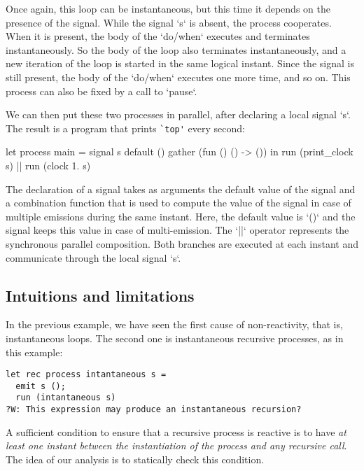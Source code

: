 \documentclass[9pt,preprint]{sigplanconf}
\begin{document}
Once again, this loop can be instantaneous, but this time it depends on the presence of the signal. While the signal `s` is absent, the process cooperates. When it is present, the body of the `do/when` executes and terminates instantaneously. So the body of the loop also terminates instantaneously, and a new iteration of the loop is started in the same logical instant. Since the signal is still present, the body of the `do/when` executes one more time, and so on. This process can also be fixed by a call to `pause`.

We can then put these two processes in parallel, after declaring a local signal `s`. The result is a program that prints \verb+`top'+ every second:
\begin{rmlcl}[18]
let process main =
  signal s default () gather (fun () () -> ()) in
  run (print_clock s) || run (clock 1. s)
\end{rmlcl}
The declaration of a signal takes as arguments the default value of the signal and a combination function that is used to compute the value of the signal in case of multiple emissions during the same instant. Here, the default value is `()` and the signal keeps this value in case of multi-emission. The `||` operator represents the synchronous parallel composition. Both branches are executed at each instant and communicate through the local signal `s`.

\subsection{Intuitions and limitations}
\label{sec:intuition}



In the previous example, we have seen the first cause of non-reactivity, that is, instantaneous loops. The second one is instantaneous recursive processes, as in this example:
\begin{lstlisting}
let rec process intantaneous s =
  emit s ();
  run (intantaneous s)
?W: This expression may produce an instantaneous recursion?
\end{lstlisting}

A sufficient condition to ensure that a recursive process is reactive is to have \emph{at least one instant between the instantiation of the process and any recursive call}. The idea of our analysis is to statically check this condition.
\end{document}

